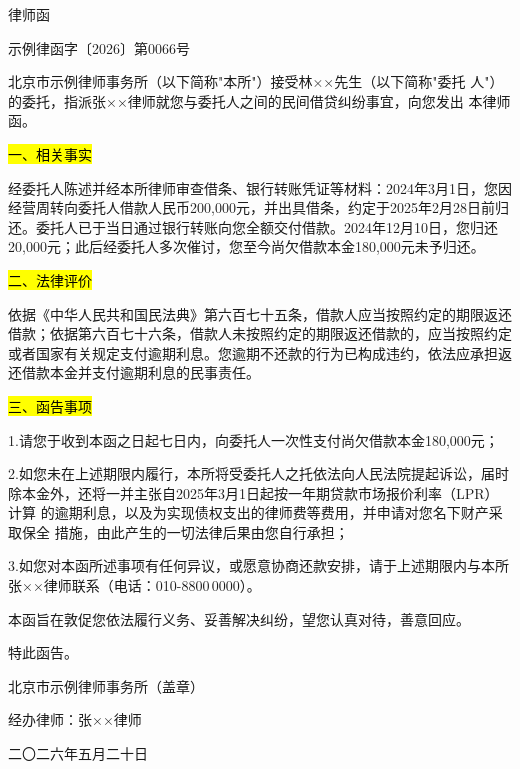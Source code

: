 \documentclass[zihao=-4]{ctexart}
\renewcommand{\opRefNo}{示例律函字〔2026〕第0066号}
\begin{document}
\pagestyle{opplain}

\opLetterhead
\begin{center}
  {\heiti{}律\hspace{1\ccwd}师\hspace{1\ccwd}函\par}
  \vspace{2bp}
  {\kaishu{}\opRefNo\par}
\end{center}
\vspace{0.2\baselineskip}


北京市示例律师事务所（以下简称"本所"）接受林××先生（以下简称"委托
人"）的委托，指派张××律师就您与委托人之间的民间借贷纠纷事宜，向您发出
本律师函。

\hl{一、相关事实}

经委托人陈述并经本所律师审查借条、银行转账凭证等材料：2024年3月1日，您因
经营周转向委托人借款人民币200,000元，并出具借条，约定于2025年2月28日前归
还。委托人已于当日通过银行转账向您全额交付借款。2024年12月10日，您归还
20,000元；此后经委托人多次催讨，您至今尚欠借款本金180,000元未予归还。

\hl{二、法律评价}

依据《中华人民共和国民法典》第六百七十五条，借款人应当按照约定的期限返还
借款；依据第六百七十六条，借款人未按照约定的期限返还借款的，应当按照约定
或者国家有关规定支付逾期利息。您逾期不还款的行为已构成违约，依法应承担返
还借款本金并支付逾期利息的民事责任。

\hl{三、函告事项}

1.请您于收到本函之日起七日内，向委托人一次性支付尚欠借款本金180,000元；

2.如您未在上述期限内履行，本所将受委托人之托依法向人民法院提起诉讼，届时
除本金外，还将一并主张自2025年3月1日起按一年期贷款市场报价利率（LPR）计算
的逾期利息，以及为实现债权支出的律师费等费用，并申请对您名下财产采取保全
措施，由此产生的一切法律后果由您自行承担；

3.如您对本函所述事项有任何异议，或愿意协商还款安排，请于上述期限内与本所
张××律师联系（电话：010-8800\,0000）。

本函旨在敦促您依法履行义务、妥善解决纠纷，望您认真对待，善意回应。

特此函告。

\vspace{1.2\baselineskip}
{\noindent\hfill 北京市示例律师事务所（盖章）\par}
{\noindent\hfill 经办律师：张××\hspace{1\ccwd}律师\par}
\vspace{0.4\baselineskip}
{\noindent\hfill 二〇二六年五月二十日\par}
\end{document}
